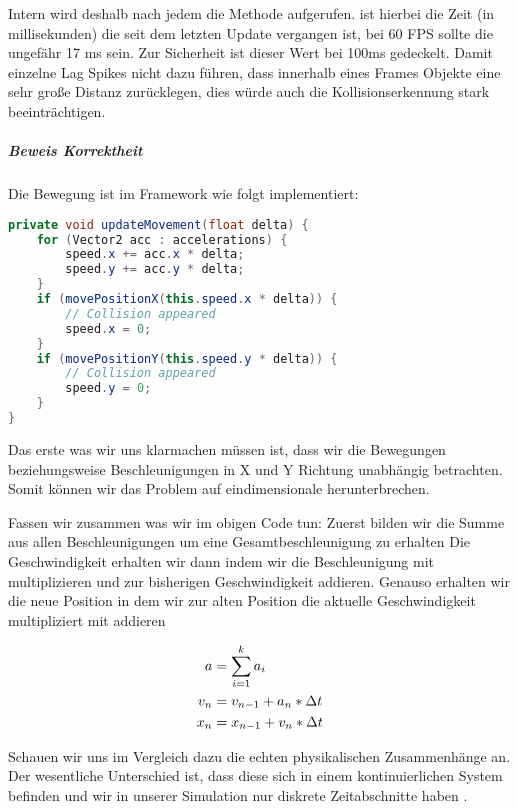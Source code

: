 Intern wird deshalb nach jedem  die Methode  aufgerufen.  ist hierbei die Zeit (in millisekunden) die seit dem letzten Update vergangen ist, bei 60 FPS sollte die ungefähr 17 ms sein. Zur Sicherheit ist dieser Wert bei 100ms gedeckelt. Damit einzelne Lag Spikes nicht dazu führen, dass innerhalb eines Frames Objekte eine sehr große Distanz zurücklegen, dies würde auch die Kollisionserkennung stark beeinträchtigen.

\subparagraph{Beweis Korrektheit}

Die Bewegung ist im Framework wie folgt implementiert:

\doinline
\begin{lstlisting}[caption=Framerate unabhängiges bewegen eines Entities, title=\hspace{0 pt}, language=java]
private void updateMovement(float delta) {
	for (Vector2 acc : accelerations) {
		speed.x += acc.x * delta;
		speed.y += acc.y * delta;
	}
	if (movePositionX(this.speed.x * delta)) {
		// Collision appeared
		speed.x = 0;
	}
	if (movePositionY(this.speed.y * delta)) {
		// Collision appeared
		speed.y = 0;
	}
}
\end{lstlisting}

Das erste was wir uns klarmachen müssen ist, dass wir die Bewegungen beziehungsweise Beschleunigungen in X und Y Richtung unabhängig betrachten. Somit können wir das Problem auf eindimensionale herunterbrechen.

Fassen wir zusammen was wir im obigen Code tun:
Zuerst bilden wir die Summe aus allen Beschleunigungen um eine Gesamtbeschleunigung zu erhalten
Die Geschwindigkeit erhalten wir dann indem wir die Beschleunigung mit  multiplizieren und zur bisherigen Geschwindigkeit addieren.
Genauso erhalten wir die neue Position in dem wir zur alten Position die aktuelle Geschwindigkeit multipliziert mit  addieren

\begin{align*}
    a &= \sum_{i=1}^{k}{a_i}  \\
  v_n &= v_{n-1} + a_n * \Delta t  \\
  x_n &= x_{n-1} + v_n * \Delta t
\end{align*}

Schauen wir uns im Vergleich dazu die echten physikalischen Zusammenhänge an. Der wesentliche Unterschied ist, dass diese sich in einem kontinuierlichen System befinden und wir in unserer Simulation nur diskrete Zeitabschnitte haben .

